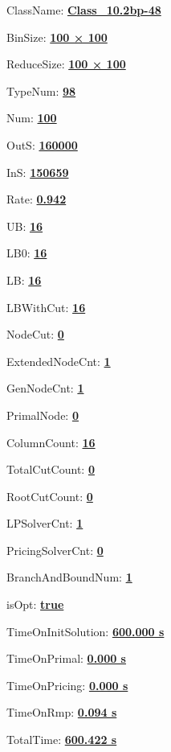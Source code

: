 \documentclass[11pt]{article}
\begin{document}
\pagestyle{empty}


ClassName: \underline{\textbf{Class_10.2bp-48}}
\par
BinSize: \underline{\textbf{100 × 100}}
\par
ReduceSize: \underline{\textbf{100 × 100}}
\par
TypeNum: \underline{\textbf{98}}
\par
Num: \underline{\textbf{100}}
\par
OutS: \underline{\textbf{160000}}
\par
InS: \underline{\textbf{150659}}
\par
Rate: \underline{\textbf{0.942}}
\par
UB: \underline{\textbf{16}}
\par
LB0: \underline{\textbf{16}}
\par
LB: \underline{\textbf{16}}
\par
LBWithCut: \underline{\textbf{16}}
\par
NodeCut: \underline{\textbf{0}}
\par
ExtendedNodeCnt: \underline{\textbf{1}}
\par
GenNodeCnt: \underline{\textbf{1}}
\par
PrimalNode: \underline{\textbf{0}}
\par
ColumnCount: \underline{\textbf{16}}
\par
TotalCutCount: \underline{\textbf{0}}
\par
RootCutCount: \underline{\textbf{0}}
\par
LPSolverCnt: \underline{\textbf{1}}
\par
PricingSolverCnt: \underline{\textbf{0}}
\par
BranchAndBoundNum: \underline{\textbf{1}}
\par
isOpt: \underline{\textbf{true}}
\par
TimeOnInitSolution: \underline{\textbf{600.000 s}}
\par
TimeOnPrimal: \underline{\textbf{0.000 s}}
\par
TimeOnPricing: \underline{\textbf{0.000 s}}
\par
TimeOnRmp: \underline{\textbf{0.094 s}}
\par
TotalTime: \underline{\textbf{600.422 s}}
\par
\newpage


\end{document}
